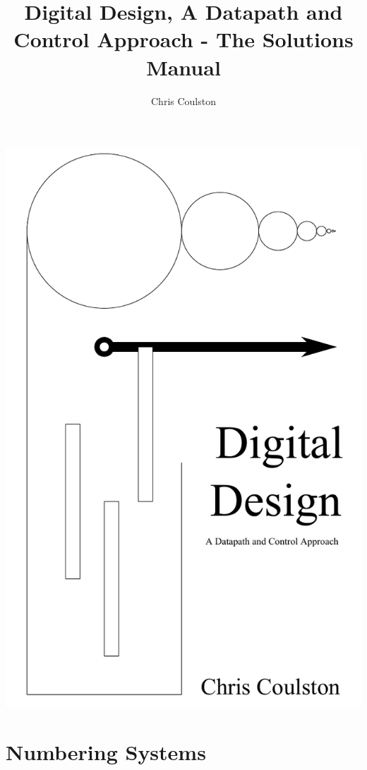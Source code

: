 \documentclass[letterpaper, 10pt]{memoir}
\begin{document}
\frontmatter
 \title{Digital Design, A Datapath and Control Approach - The Solutions Manual}
 \author{Chris Coulston}
 \date{}
 \maketitle

\includegraphics{./Fig/cover}
\showanswers

\tableofcontents
\mainmatter

\chapter{Numbering Systems}

\end{document}
